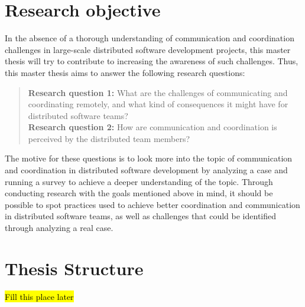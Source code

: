\section{Research objective}
In the absence of a thorough understanding of communication and coordination challenges in large-scale distributed software development projects, this master thesis will try to contribute to increasing the awareness of such challenges. Thus, this master thesis aims to answer the following research questions:

\begin{quote}
\textbf{Research question 1:} What are the challenges of communicating and coordinating remotely, and what kind of consequences it might have for distributed software teams?\\
\textbf{Research question 2:} How are communication and coordination is perceived by the distributed team members?
\end{quote}

The motive for these questions is to look more into the topic of communication and coordination in distributed software development by analyzing a case and running a survey to achieve a deeper understanding of the topic. Through conducting research with the goals mentioned above in mind, it should be possible to spot practices used to achieve better coordination and communication in distributed software teams, as well as challenges that could be identified through analyzing a real case. 


\section{Thesis Structure}
\hl{Fill this place later}



